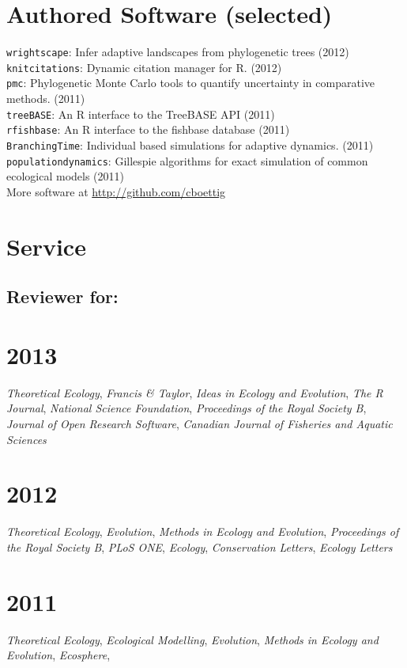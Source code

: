 \documentclass[margin]{res}
\begin{document}
\begin{resume}
  \section{Authored Software (selected)} 
{ \footnotesize
\texttt{wrightscape}: Infer adaptive landscapes from phylogenetic trees (2012) \\
\texttt{knitcitations}: Dynamic citation manager for R. (2012) \\
\texttt{pmc}: Phylogenetic Monte Carlo tools to quantify uncertainty in comparative methods. (2011)\\
\texttt{treeBASE}: An R interface to the TreeBASE API (2011) \\
\texttt{rfishbase}: An R interface to the fishbase database (2011) \\
\texttt{BranchingTime}: Individual based simulations for adaptive dynamics. (2011) \\
\texttt{populationdynamics}: Gillespie algorithms for exact simulation of common ecological models (2011) \\ 
More software at \href{http://github.com/cboettig}{http://github.com/cboettig}
}

\section{Service}
\subsection{Reviewer for:}
\section{\textnormal{2013}}
\emph{Theoretical Ecology}, \emph{Francis \& Taylor}, \emph{Ideas in Ecology and Evolution}, \emph{The R Journal}, \emph{National Science Foundation}, \emph{Proceedings of the Royal Society B}, \emph{Journal of Open Research Software}, \emph{Canadian Journal of Fisheries and Aquatic Sciences} 

\section{\textnormal{2012}}
\emph{Theoretical Ecology}, \emph{Evolution}, \emph{Methods in Ecology and Evolution}, \emph{Proceedings of the Royal Society B}, \emph{PLoS ONE}, \emph{Ecology}, \emph{Conservation Letters}, \emph{Ecology Letters} 

\section{\textnormal{2011}}
\emph{Theoretical Ecology}, \emph{Ecological Modelling}, \emph{Evolution}, \emph{Methods in Ecology and Evolution}, \emph{Ecosphere}, 


\end{resume}
\end{document}
